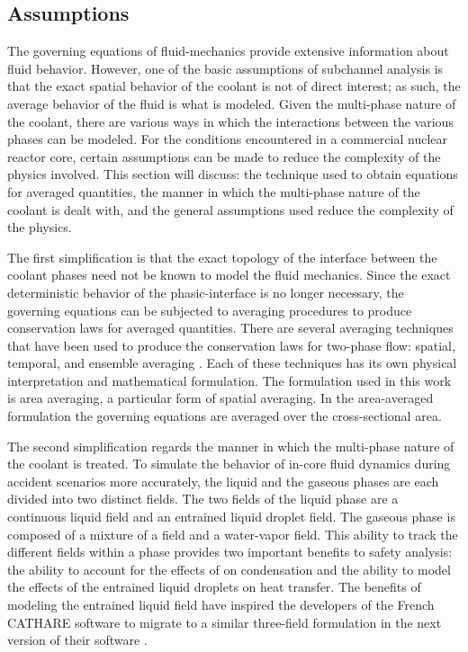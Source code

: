 \subsection{Assumptions}
\label{subsect:assumptions}

The governing equations of fluid-mechanics provide extensive information about fluid behavior.
However, one of the basic assumptions of subchannel analysis is that the exact spatial behavior of the coolant is not of direct interest; as such, the average behavior of the fluid is what is modeled.
Given the multi-phase nature of the coolant, there are various ways in which the interactions between the various phases can be modeled.
For the conditions encountered in a commercial nuclear reactor core, certain assumptions can be made to reduce the complexity of the physics involved.
This section will discuss: the technique used to obtain equations for averaged quantities, the manner in which the multi-phase nature of the coolant is dealt with, and the general assumptions used reduce the complexity of the physics.

The first simplification is that the exact topology of the interface between the coolant phases need not be known to model the fluid mechanics.
Since the exact deterministic behavior of the phasic-interface is no longer necessary, the governing equations can be subjected to averaging procedures to produce conservation laws for averaged quantities.
There are several averaging techniques that have been used to produce the conservation laws for two-phase flow: spatial, temporal, and ensemble averaging \cite{Drew1998, Todreas2011}.
Each of these techniques has its own physical interpretation and mathematical formulation.
The formulation used in this work is area averaging, a particular form of spatial averaging.
In the area-averaged formulation the governing equations are averaged over the cross-sectional area.

The second simplification regards the manner in which the multi-phase nature of the coolant is treated.
To simulate the behavior of in-core fluid dynamics during accident scenarios more accurately, the liquid and the gaseous phases are each divided into two distinct fields.
The two fields of the liquid phase are a continuous liquid field and an entrained liquid droplet field.
The gaseous phase is composed of a mixture of a \ncg{} field and a water-vapor field. 
This ability to track the different fields within a phase provides two important benefits to safety analysis: the ability to account for the effects of \ncgs{} on condensation and the ability to model the effects of the entrained liquid droplets on heat transfer.
The benefits of modeling the entrained liquid field have inspired the developers of the French CATHARE software to migrate to a similar three-field formulation in the next version of their software \cite{Emonot2011}.

